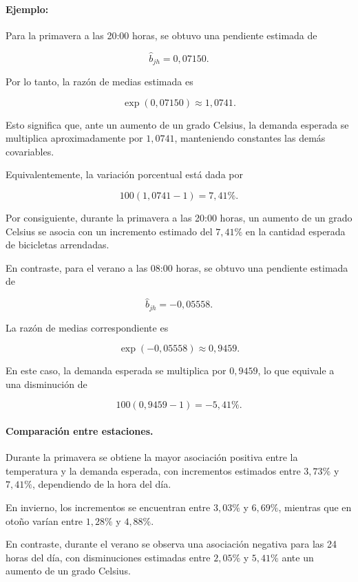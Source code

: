 \documentclass[12pt, a4paper]{article}
\numberwithin{equation}{section}
\begin{document}
\paragraph{Ejemplo:}

Para la primavera a las 20:00 horas, se obtuvo una
pendiente estimada de

\[
\widehat{b}_{jh}=0{,}07150.
\]

Por lo tanto, la razón de medias estimada es

\[
\exp(0{,}07150)\approx 1{,}0741.
\]

Esto significa que, ante un aumento de un grado Celsius,
la demanda esperada se multiplica aproximadamente
por $1{,}0741$, manteniendo constantes las demás
covariables.

Equivalentemente, la variación porcentual está dada por

\[
100(1{,}0741-1)=7{,}41\%.
\]

Por consiguiente, durante la primavera a las 20:00 horas,
un aumento de un grado Celsius se asocia con un
incremento estimado del $7{,}41\%$ en la cantidad
esperada de bicicletas arrendadas.

En contraste, para el verano a las 08:00 horas,
se obtuvo una pendiente estimada de

\[
\widehat{b}_{jh}=-0{,}05558.
\]

La razón de medias correspondiente es

\[
\exp(-0{,}05558)\approx 0{,}9459.
\]

En este caso, la demanda esperada se multiplica por
$0{,}9459$, lo que equivale a una disminución de

\[
100(0{,}9459-1)=-5{,}41\%.
\]

\paragraph{Comparación entre estaciones.}

Durante la primavera se obtiene la mayor asociación
positiva entre la temperatura y la demanda esperada,
con incrementos estimados entre $3{,}73\%$ y $7{,}41\%$,
dependiendo de la hora del día.

En invierno, los incrementos se encuentran entre
$3{,}03\%$ y $6{,}69\%$, mientras que en otoño varían
entre $1{,}28\%$ y $4{,}88\%$.

En contraste, durante el verano se observa una
asociación negativa para las 24 horas del día,
con disminuciones estimadas entre $2{,}05\%$ y
$5{,}41\%$ ante un aumento de un grado Celsius.
\end{document}
